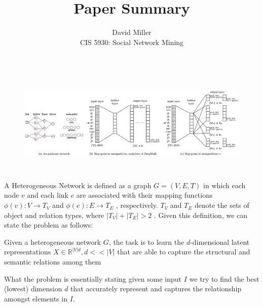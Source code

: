 \documentclass[12pt]{article}
\newenvironment{definition}[2][]{\begin{trivlist}
\item[{\bfseries #1}\hskip \labelsep {\bfseries #2.}]}{\end{trivlist}}
\theoremstyle{remark}
\begin{document}
 
\title{Paper Summary}
\author{David Miller \\ 
CIS 5930: Social Network Mining} 

\maketitle 

\begin{figure}[H]{}
	\centering
	\vspace{-15pt}
	\hspace{-10pt}
	\includegraphics[height=5cm,width=1\textwidth]{fig1.eps}
	\caption{}
	\vspace{0pt}
\end{figure} 

A Heterogeneous Network is defined as a graph $G = (V , E,T )$ in which each node $v$ and each link $e$ are associated with their mapping functions $\phi(v) : V \rightarrow T_V$ and $\phi(e) : E \rightarrow T_E$ ,
respectively. $T_V$ and $T_E$ denote the sets of object and relation types,
where $|T_V| + |T_E| > 2$ \cite{paper}. Given this definition, we can state the problem as follows:
\begin{definition}{Problem}
	Given a heterogeneous network $G$, the task is to learn the $d$-dimensional latent representations $X \in \mathbb{R}^{|V|d} , d << |V|$  that are able to capture the structural and semantic relations among them
\end{definition} 

What the problem is essentially stating given some input $I$ we try to find the best (lowest) dimension $d$ that accurately represent and captures the relationship amongst elements in $I$. \\ 
\end{document}
